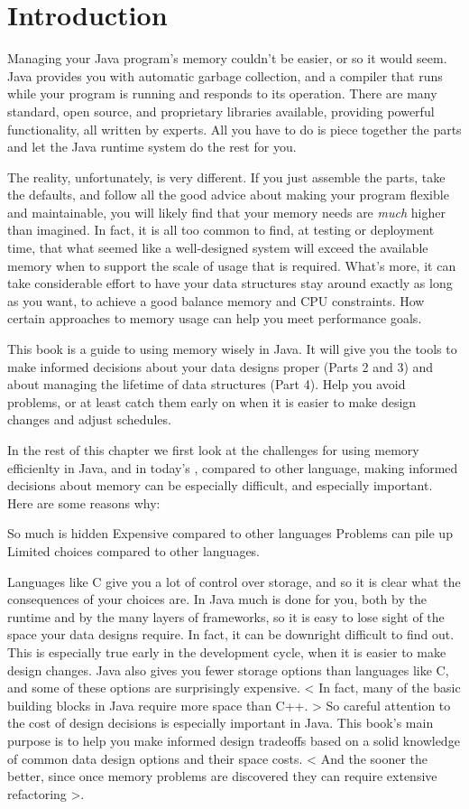 
\chapter{Introduction}

Managing your Java program's memory couldn't be easier, or so it would
seem. Java provides you with automatic garbage collection, and a compiler that
runs while your program is running and responds to its operation. There are
many standard, open source, and proprietary libraries available, providing
powerful functionality, all written by experts. All you have to do is piece
together the parts and let the Java runtime system do the rest for you.

The reality, unfortunately, is very different. If you just assemble the parts,
take the defaults, and follow all the good advice about making your
program flexible and maintainable, you will likely find that your memory needs are
\emph{much} higher than imagined. In fact, it is all too common to find, at
testing or deployment time, that what seemed like a well-designed system will
exceed the available memory when to support the scale of usage that is
required. What's more, it can take considerable effort to have your data structures stay around exactly as long as you want, to achieve a good balance memory and CPU constraints. How certain approaches to memory usage can help you meet performance goals.

This book is a guide to using memory wisely in Java. It will give you the tools
to make informed decisions about your data designs proper (Parts 2 and 3) and about managing the
lifetime of data structures (Part 4).  Help you avoid problems, or at least
catch them early on when it is easier to make design changes and adjust
schedules.

In the rest of this chapter we first look at the challenges for using memory
efficienlty in Java, and in today's , compared to other language, making
informed decisions about memory can be especially difficult, and especially important.  Here are some reasons why:


So much is hidden
Expensive compared to other languages
Problems can pile up
Limited choices compared to other languages.

Languages like C give you a lot of control over storage, and so it is clear what
the consequences of your choices are. In Java much is done for you, both by the runtime and by the many layers of frameworks, so it is easy to lose sight of the space your data designs require. In fact, it can be downright difficult to find out. This is especially true early in the development cycle, when it is easier to make design changes.  Java also gives you fewer storage options than languages like C, and some of these options are surprisingly expensive. < In fact, many of the basic building blocks in Java require more space than C++. > So careful attention to the cost of design decisions is especially important in Java.  This book's main purpose is to help you make informed design tradeoffs based on a solid knowledge of common data design options and their space costs.  < And the sooner the better, since once memory problems are discovered they can require extensive
refactoring >. 

